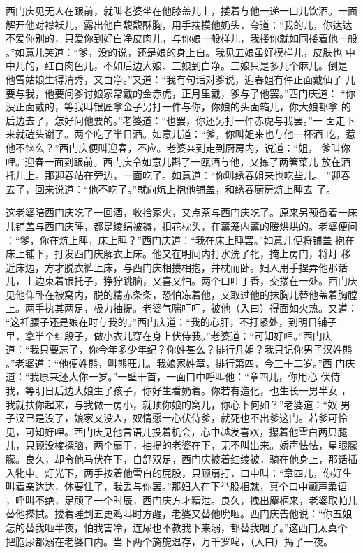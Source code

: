 西门庆见无人在跟前，就叫老婆坐在他膝盖儿上，搂着与他一递一口儿饮酒。一面
解开他对襟袄儿，露出他白馥馥酥胸，用手揣摸他奶头，夸道：“我的儿，你达达
不爱你别的，只爱你到好白净皮肉儿，与你娘一般样儿，我搂你就如同搂着他一般
。”如意儿笑道：“爹，没的说，还是娘的身上白。我见五娘虽好模样儿，皮肤也
中中儿的，红白肉色儿，不如后边大娘、三娘到白净。三娘只是多几个麻儿。倒是
他雪姑娘生得清秀，又白净。”又道：“我有句话对爹说，迎春姐有件正面戴仙子
儿要与我，他要问爹讨娘家常戴的金赤虎，正月里戴，爹与了他罢。”西门庆道：
“你没正面戴的，等我叫银匠拿金子另打一件与你，你娘的头面箱儿，你大娘都拿
的后边去了，怎好问他要的。”老婆道：“也罢，你还另打一件赤虎与我罢。”一
面走下来就磕头谢了。两个吃了半日酒。如意儿道：“爹，你叫姐来也与他一杯酒
吃，惹他不恼么？”西门庆便叫迎春，不应。老婆亲到走到厨房内，说道：“姐，
爹叫你哩。”迎春一面到跟前。西门庆令如意儿斟了一瓯酒与他，又拣了两箸菜儿
放在酒托儿上。那迎春站在旁边，一面吃了。如意道：“你叫绣春姐来也吃些儿。
”迎春去了，回来说道：“他不吃了。”就向炕上抱他铺盖，和绣春厨房炕上睡去
了。

这老婆陪西门庆吃了一回酒，收拾家火，又点茶与西门庆吃了。原来另预备着一床
儿铺盖与西门庆睡，都是绫绢被褥，扣花枕头，在薰笼内薰的暖烘烘的。老婆便问
：“爹，你在炕上睡，床上睡？”西门庆道：“我在床上睡罢。”如意儿便将铺盖
抱在床上铺下，打发西门庆解衣上床。他又在明间内打水洗了牝，掩上房门，将灯
移近床边，方才脱衣裤上床，与西门庆相搂相抱，并枕而卧。妇人用手捏弄他那话
儿，上边束着银托子，狰狞跳脑，又喜又怕。两个口吐丁香，交搂在一处。西门庆
见他仰卧在被窝内，脱的精赤条条，恐怕冻着他，又取过他的抹胸儿替他盖着胸膛
上。两手执其两足，极力抽提。老婆气喘吁吁，被他（入曰）得面如火热。又道：
“这衽腰子还是娘在时与我的。”西门庆道：“我的心肝，不打紧处，到明日铺子
里，拿半个红段子，做小衣儿穿在身上伏侍我。”老婆道：“可知好哩。”西门庆
道：“我只要忘了，你今年多少年纪？你姓甚么？排行几姐？我只记你男子汉姓熊
。”老婆道：“他便姓熊，叫熊旺儿。我娘家姓章，排行第四，今三十二岁。”西
门庆道：“我原来还大你一岁。”一壁干首，一面口中呼叫他：“章四儿，你用心
伏侍我，等明日后边大娘生了孩子，你好生看奶着。你若有造化，也生长一男半女
，我就扶你起来，与我做一房小，就顶你娘的窝儿，你心下何如？”老婆道：“奴
男子汉已是没了，娘家又没人，奴情愿一心伏侍爹，就死也不出爹这门。若爹可怜
见，可知好哩。”西门庆见他言语儿投着机会，心中越发喜欢，攥着他雪白两只腿
儿，只顾没棱探脑，两个扇干，抽提的老婆在下，无不叫出来。娇声怯怯，星眼朦
朦。良久，却令他马伏在下，自舒双足，西门庆披着红绫被，骑在他身上，那话插
入牝中。灯光下，两手按着他雪白的屁股，只顾扇打，口中叫：“章四儿，你好生
叫着亲达达，休要住了，我丢与你罢。”那妇人在下举股相就，真个口中颤声柔语
，呼叫不绝，足顽了一个时辰，西门庆方才精泄。良久，拽出麈柄来，老婆取帕儿
替他搽拭。搂着睡到五更鸡叫时方醒，老婆又替他吮咂。西门庆告他说：“你五娘
怎的替我咂半夜，怕我害冷，连尿也不教我下来溺，都替我咽了。”这西门太真个
把胞尿都溺在老婆口内。当下两个旖旎温存，万千罗唣，（入曰）捣了一夜。

